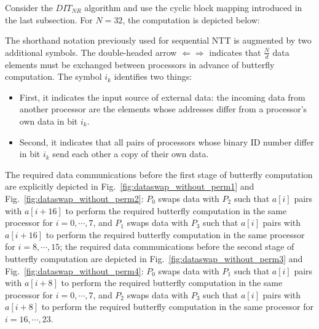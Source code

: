 \documentclass[submission]{iacrtrans}
\theoremstyle{plain}
\begin{document}
Consider the $DIT_{NR}$ algorithm and use the cyclic block mapping introduced in the last subsection. For $N=32$, the computation is depicted below:

\begin{table}[h!]\begin{center}
\end{center}\end{table}

The shorthand notation previously used for sequential NTT is augmented by two additional symbols. The double-headed arrow $\Longleftarrow\Longrightarrow$ indicates that $\frac{N}{d}$ data elements must be exchanged between processors in advance of butterfly computation. The symbol $i_k$ identifies two things:
\begin{itemize}
  \item First, it indicates the input source of external data: the incoming data from another processor are the elements whose addresses differ from a processor's own data in bit $i_k$.
  \item Second, it indicates that all pairs of processors whose binary ID number differ in bit $i_k$ send each other a copy of their own data.
\end{itemize}

The required data communications before the first stage of butterfly computation are explicitly depicted in Fig.~\ref{fig:dataswap_without_perm1} and Fig.~\ref{fig:dataswap_without_perm2}:  $P_0$ swaps data with $P_2$ such that $a[i]$ pairs with $a[i+16]$ to perform the required butterfly computation in the same processor for $i=0,\cdots,7$, and $P_1$ swaps data with $P_3$ such that $a[i]$ pairs with $a[i+16]$ to perform the required butterfly computation in the same processor for $i=8,\cdots,15$; the required data communications before the second stage of butterfly computation are depicted in Fig.~\ref{fig:dataswap_without_perm3} and Fig.~\ref{fig:dataswap_without_perm4}: $P_0$ swaps data with $P_1$ such that $a[i]$ pairs with $a[i+8]$ to perform the required butterfly computation in the same processor for $i=0,\cdots,7$, and $P_2$ swaps data with $P_3$ such that $a[i]$ pairs with $a[i+8]$ to perform the required butterfly computation in the same processor for $i=16,\cdots,23$.
\end{document}
